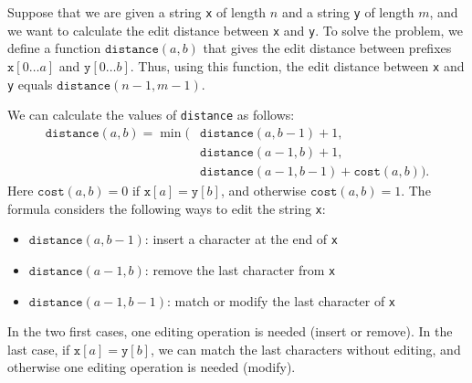 Suppose that we are given a string \texttt{x}
of length $n$ and a string \texttt{y} of length $m$,
and we want to calculate the edit distance between
\texttt{x} and \texttt{y}.
To solve the problem, we define a function
$\texttt{distance}(a,b)$ that gives the
edit distance between prefixes
$\texttt{x}[0 \ldots a]$ and $\texttt{y}[0 \ldots b]$.
Thus, using this function, the edit distance
between \texttt{x} and \texttt{y} equals $\texttt{distance}(n-1,m-1)$.

We can calculate the values of \texttt{distance}
as follows:
\begin{equation*}
\begin{split}
\texttt{distance}(a,b) = \min(& \texttt{distance}(a,b-1)+1, \\
                           & \texttt{distance}(a-1,b)+1, \\
                           & \texttt{distance}(a-1,b-1)+\texttt{cost}(a,b)).
\end{split}
\end{equation*}
Here $\texttt{cost}(a,b)=0$ if $\texttt{x}[a]=\texttt{y}[b]$,
and otherwise $\texttt{cost}(a,b)=1$.
The formula considers the following ways to
edit the string \texttt{x}:
\begin{itemize}
\item $\texttt{distance}(a,b-1)$: insert a character at the end of \texttt{x}
\item $\texttt{distance}(a-1,b)$: remove the last character from \texttt{x}
\item $\texttt{distance}(a-1,b-1)$: match or modify the last character of \texttt{x}
\end{itemize}
In the two first cases, one editing operation is needed
(insert or remove).
In the last case, if $\texttt{x}[a]=\texttt{y}[b]$,
we can match the last characters without editing,
and otherwise one editing operation is needed (modify).

